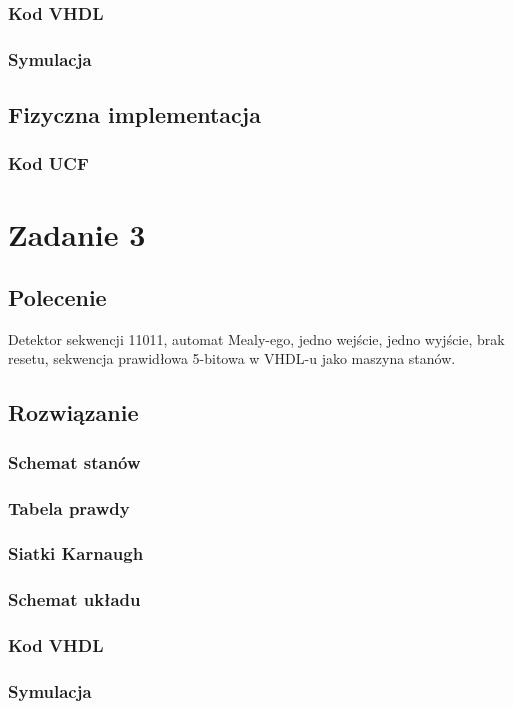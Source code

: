 \documentclass[a4paper,12pt]{extarticle}  %
\begin{document}
\subsubsection{Kod VHDL}
\subsubsection{Symulacja}
\subsection{Fizyczna implementacja}
\subsubsection{Kod UCF}

\section{Zadanie 3}
\subsection{Polecenie}
Detektor sekwencji 11011, automat Mealy-ego, jedno wejście, jedno wyjście, brak resetu, sekwencja prawidłowa 5-bitowa w VHDL-u jako maszyna stanów.
\subsection{Rozwiązanie}
\subsubsection{Schemat stanów}
\subsubsection{Tabela prawdy}
\subsubsection{Siatki Karnaugh}
\subsubsection{Schemat układu}
\subsubsection{Kod VHDL}
\subsubsection{Symulacja}
\end{document}
